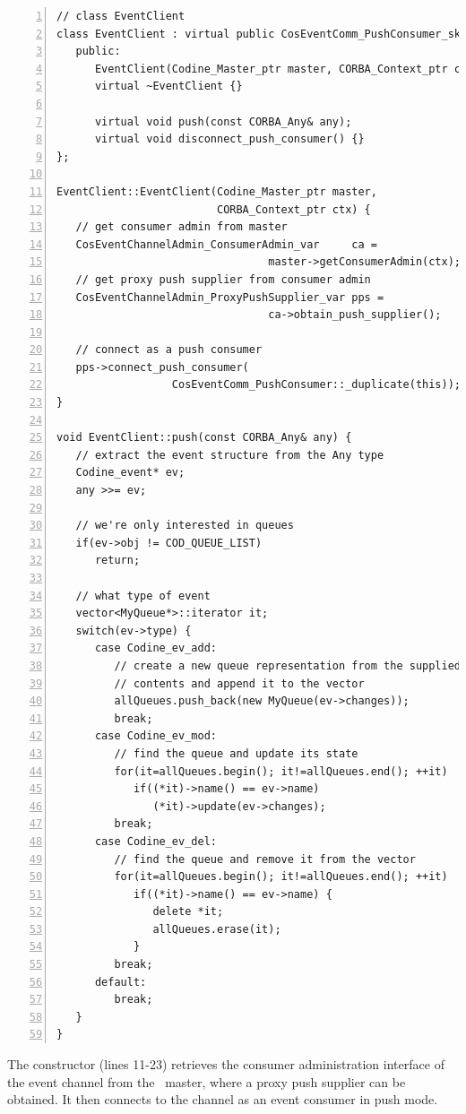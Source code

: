 \begin{Verbatim}[frame=lines, numbers=left, fontsize=\small, framerule=1mm]
// class EventClient
class EventClient : virtual public CosEventComm_PushConsumer_skel {
   public:
      EventClient(Codine_Master_ptr master, CORBA_Context_ptr ctx);
      virtual ~EventClient {}

      virtual void push(const CORBA_Any& any);
      virtual void disconnect_push_consumer() {}
};

EventClient::EventClient(Codine_Master_ptr master,
                         CORBA_Context_ptr ctx) {
   // get consumer admin from master
   CosEventChannelAdmin_ConsumerAdmin_var     ca = 
                                 master->getConsumerAdmin(ctx);
   // get proxy push supplier from consumer admin
   CosEventChannelAdmin_ProxyPushSupplier_var pps = 
                                 ca->obtain_push_supplier();

   // connect as a push consumer
   pps->connect_push_consumer(
                  CosEventComm_PushConsumer::_duplicate(this));
}

void EventClient::push(const CORBA_Any& any) {
   // extract the event structure from the Any type
   Codine_event* ev;
   any >>= ev;

   // we're only interested in queues
   if(ev->obj != COD_QUEUE_LIST)
      return;

   // what type of event
   vector<MyQueue*>::iterator it;
   switch(ev->type) {
      case Codine_ev_add:
         // create a new queue representation from the supplied
         // contents and append it to the vector
         allQueues.push_back(new MyQueue(ev->changes));
         break;
      case Codine_ev_mod:
         // find the queue and update its state
         for(it=allQueues.begin(); it!=allQueues.end(); ++it)
            if((*it)->name() == ev->name)
               (*it)->update(ev->changes);
         break;
      case Codine_ev_del:
         // find the queue and remove it from the vector
         for(it=allQueues.begin(); it!=allQueues.end(); ++it)
            if((*it)->name() == ev->name) {
               delete *it;
               allQueues.erase(it);
            }
         break;
      default:
         break;
   }
}
\end{Verbatim}

The constructor (lines 11-23) retrieves the consumer administration interface
of the event channel from the \qidl\ master, where a proxy push supplier can
be obtained. It then connects to the channel as an event consumer in push
mode.


